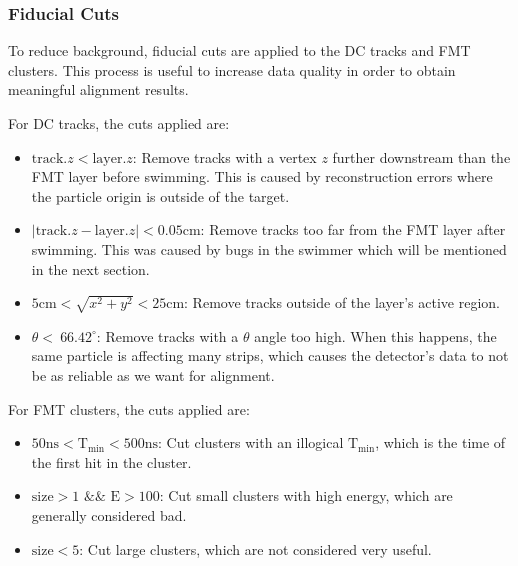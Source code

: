 \subsubsection{Fiducial Cuts}
    To reduce background, fiducial cuts are applied to the DC tracks and FMT clusters.
    This process is useful to increase data quality in order to obtain meaningful alignment results.
    
    For DC tracks, the cuts applied are:
    \begin{itemize}
        \item $\text{track}.z < \text{layer}.z$:
        Remove tracks with a vertex $z$ further downstream than the FMT layer before swimming.
        This is caused by reconstruction errors where the particle origin is outside of the target.
        \item $\mid\text{track}.z - \text{layer}.z\mid < 0.05 \text{cm}$:
        Remove tracks too far from the FMT layer after swimming.
        This was caused by bugs in the swimmer which will be mentioned in the next section.
        \item $5 \text{cm} < \sqrt{x^2 + y^2} < 25 \text{cm}$:
        Remove tracks outside of the layer's active region.
        \item $\theta < ~66.42^{\circ}$:
        Remove tracks with a $\theta$ angle too high.
        When this happens, the same particle is affecting many strips, which causes the detector's data to not be as reliable as we want for alignment.
    \end{itemize}
    
    For FMT clusters, the cuts applied are:
    \begin{itemize}
        \item $50 \text{ns} < \text{T}_{\text{min}} < 500 \text{ns}$:
        Cut clusters with an illogical $\text{T}_{\text{min}}$, which is the time of the first hit in the cluster.
        \item $\text{size} > 1$ $\&\&$ $\text{E} > 100$:
        Cut small clusters with high energy, which are generally considered bad.
        \item $\text{size} < 5$:
        Cut large clusters, which are not considered very useful.
    \end{itemize}

